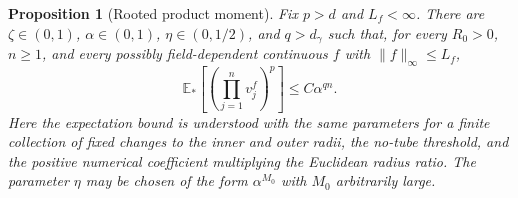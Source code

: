 \documentclass[11pt,reqno]{amsart}
\theoremstyle{plain}
\newtheorem{proposition}[theorem]{Proposition}
\theoremstyle{definition}
\theoremstyle{remark}
\newcommand{\E}{\mathbb E}
\newcommand{\1}{\mathbf{1}}
\begin{document}
\begin{proposition}[Rooted product moment]\label{prop:product}
Fix $p>d$ and $L_f<\infty$. There are $\zeta\in(0,1)$, $\alpha\in(0,1)$, $\eta\in(0,1/2)$, and $q>d_\gamma$ such that, for every $R_0>0$, $n\ge1$, and every possibly field-dependent continuous $f$ with $\|f\|_\infty\le L_f$,
\begin{equation}\label{eq:product}
\E_*\left[\left(\prod_{j=1}^n v_j^f\right)^p\right]\le C\alpha^{qn}.
\end{equation}
Here the expectation bound is understood with the same parameters for a finite collection of fixed changes to the inner and outer radii, the no-tube threshold, and the positive numerical coefficient multiplying the Euclidean radius ratio. The parameter $\eta$ may be chosen of the form $\alpha^{M_0}$ with $M_0$ arbitrarily large.
\end{proposition}
\end{document}
